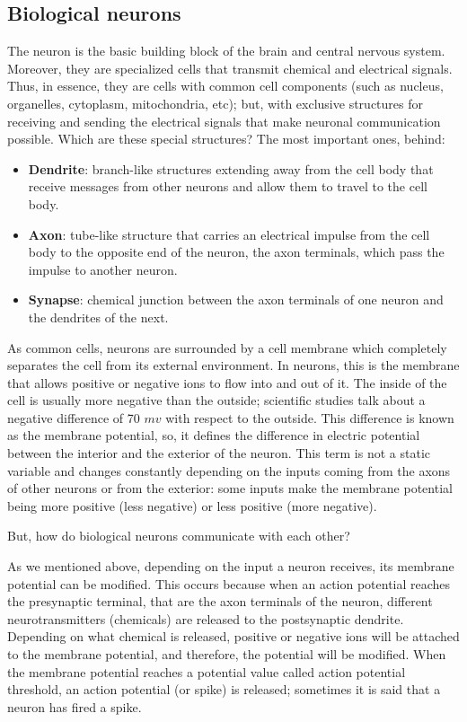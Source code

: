 \documentclass{article} %
\begin{document}
\subsection{Biological neurons}
The neuron is the basic building block of the brain and central nervous system. Moreover, they are specialized cells that transmit chemical and electrical signals. Thus, in essence, they are cells with common cell components (such as nucleus, organelles, cytoplasm, mitochondria, etc); but, with exclusive structures for receiving and sending the electrical signals that make neuronal communication possible. Which are these special structures? The most important ones, behind:
\begin{itemize}
    \item \textbf{Dendrite}:
    branch-like structures extending away from the cell body that receive messages from other neurons and allow them to travel to the cell body.
   
    \item \textbf{Axon}:
    tube-like structure that carries an electrical impulse from the cell body to the opposite end of the neuron, the axon terminals, which pass the impulse to another neuron.
    
    \item \textbf{Synapse}:
    chemical junction between the axon terminals of one neuron and the dendrites of the next.
\end{itemize}

As common cells, neurons are surrounded by a cell membrane which completely separates the cell from its external environment. In neurons, this is the membrane that allows positive or negative ions to flow into and out of it. The inside of the cell is usually more negative than the outside; scientific studies talk about a negative difference of 70 \(mv\) with respect to the outside. This difference is known as the membrane potential, so, it defines the difference in electric potential between the interior and the exterior of the neuron. This term is not a static variable and changes constantly depending on the inputs coming from the axons of other neurons or from the exterior: some inputs make the membrane potential being more positive (less negative) or less positive (more negative).

But, how do biological neurons communicate with each other? 

As we mentioned above, depending on the input a neuron receives, its membrane potential can be modified. This occurs because when an action potential reaches the presynaptic terminal, that are the axon terminals of the neuron, different neurotransmitters (chemicals) are released to the postsynaptic dendrite. Depending on what chemical is released, positive or negative ions will be attached to the membrane potential, and therefore, the potential will be modified. When the membrane potential reaches a potential value called action potential threshold, an action potential (or spike) is released; sometimes it is said that a neuron has fired a spike.
\end{document}
